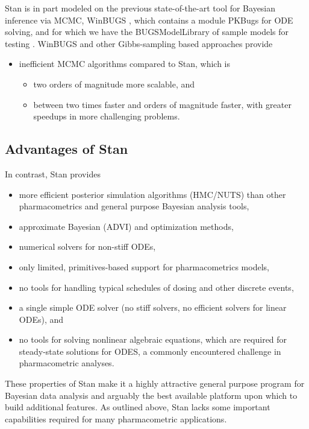 Stan is in part modeled on the previous state-of-the-art tool for
Bayesian inference via MCMC, WinBUGS \citep{lunn-et-al:2000}, which
contains a module PKBugs for ODE solving, and for which we have the
BUGSModelLibrary of sample models for testing
\citep{gastonguay-et-al:2010}.  WinBUGS and other Gibbs-sampling based
approaches provide

\begin{itemize}
\item inefficient MCMC algorithms compared to Stan, which is
\begin{itemize}
\item  two orders of magnitude more scalable, and
\item  between two times faster and orders of magnitude faster,
  with greater speedups in more challenging problems.
\end{itemize}
\end{itemize}

\subsection{Advantages of Stan}

In contrast, Stan provides

\begin{itemize}
\item more efficient posterior simulation algorithms (HMC/NUTS) than
  other pharmacometrics and general purpose Bayesian analysis tools,
\item approximate Bayesian (ADVI) and optimization methods,
\item numerical solvers for non-stiff ODEs,
\item only limited, primitives-based support for pharmacometrics models,
\item no tools for handling typical schedules of dosing and other discrete events,
\item a single simple ODE solver (no stiff solvers, no efficient
  solvers for linear ODEs), and
\item no tools for solving nonlinear algebraic equations, which are
  required for steady-state solutions for ODES, a commonly encountered
  challenge in pharmacometric analyses.
\end{itemize}

These properties of Stan make it a highly attractive general purpose
program for Bayesian data analysis and arguably the best available
platform upon which to build additional features. As outlined above,
Stan lacks some important capabilities required for many
pharmacometric applications.


